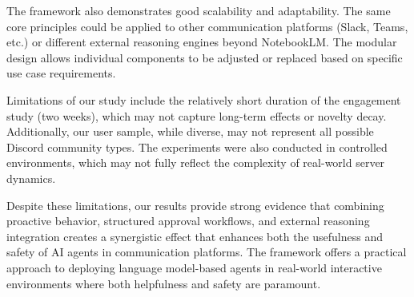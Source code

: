 The framework also demonstrates good scalability and adaptability. The same core principles could be applied to other communication platforms (Slack, Teams, etc.) or different external reasoning engines beyond NotebookLM. The modular design allows individual components to be adjusted or replaced based on specific use case requirements.

Limitations of our study include the relatively short duration of the engagement study (two weeks), which may not capture long-term effects or novelty decay. Additionally, our user sample, while diverse, may not represent all possible Discord community types. The experiments were also conducted in controlled environments, which may not fully reflect the complexity of real-world server dynamics.

Despite these limitations, our results provide strong evidence that combining proactive behavior, structured approval workflows, and external reasoning integration creates a synergistic effect that enhances both the usefulness and safety of AI agents in communication platforms. The framework offers a practical approach to deploying language model-based agents in real-world interactive environments where both helpfulness and safety are paramount.